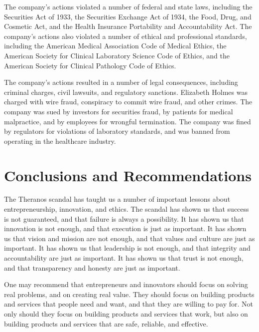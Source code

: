 \documentclass[stu]{apa7}
\begin{document}
\begin{multicols}{2}
    The company's actions violated a number of federal and state laws, including
    the Securities Act of 1933, the Securities Exchange Act of 1934, the Food,
    Drug, and Cosmetic Act, and the Health Insurance Portability and
    Accountability Act. The company's actions also violated a number of ethical
    and professional standards, including the American Medical Association Code
    of Medical Ethics, the American Society for Clinical Laboratory Science Code
    of Ethics, and the American Society for Clinical Pathology Code of Ethics.
    \cite{ama, clpmag, ascp}

    The company's actions resulted in a number of legal consequences, including
    criminal charges, civil lawsuits, and regulatory sanctions. Elizabeth Holmes
    was charged with wire fraud, conspiracy to commit wire fraud, and other crimes.
    The company was sued by investors for securities fraud, by patients for medical
    malpractice, and by employees for wrongful termination. The company was fined
    by regulators for violations of laboratory standards, and was banned from
    operating in the healthcare industry. \cite{wp}

    \section{Conclusions and Recommendations}

    The Theranos scandal has taught us a number of important lessons about
    entrepreneurship, innovation, and ethics. The scandal has shown us that
    success is not guaranteed, and that failure is always a possibility. It has
    shown us that innovation is not enough, and that execution is just as
    important. It has shown us that vision and mission are not enough, and that
    values and culture are just as important. It has shown us that leadership is
    not enough, and that integrity and accountability are just as important. It
    has shown us that trust is not enough, and that transparency and honesty are
    just as important.

    One may recommend that entrepreneurs and innovators should focus on solving
    real problems, and on creating real value. They should focus on building
    products and services that people need and want, and that they are willing
    to pay for. Not only should they focus on building products and services
    that work, but also on building products and services that are safe, reliable,
    and effective. 

    \end{multicols}

    \newpage
    \printbibliography[heading=bibintoc]
\end{document}
